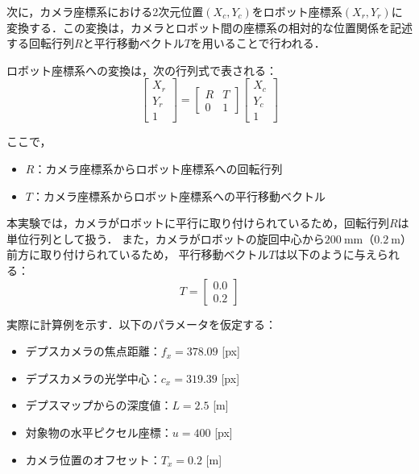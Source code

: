 次に，カメラ座標系における2次元位置$(X_c, Y_c)$をロボット座標系$(X_r, Y_r)$に変換する．この変換は，カメラとロボット間の座標系の相対的な位置関係を記述する回転行列$R$と平行移動ベクトル$T$を用いることで行われる．

ロボット座標系への変換は，次の行列式で表される：
\begin{equation}
    \begin{bmatrix}
        X_r \\ Y_r \\ 1
    \end{bmatrix}
    =
    \begin{bmatrix}
        R & T \\ 
        0 & 1
    \end{bmatrix}
    \begin{bmatrix}
        X_c \\ Y_c \\ 1
    \end{bmatrix}
    \label{eq:transform}
\end{equation}

ここで，
\begin{itemize}
    \item $R$：カメラ座標系からロボット座標系への回転行列
    \item $T$：カメラ座標系からロボット座標系への平行移動ベクトル
\end{itemize}

本実験では，カメラがロボットに平行に取り付けられているため，回転行列$R$は単位行列として扱う．
また，カメラがロボットの旋回中心から$200\ \mathrm{mm}$（$0.2\ \mathrm{m}$）前方に取り付けられているため，
平行移動ベクトル$T$は以下のように与えられる：
\begin{equation}
    T = \begin{bmatrix} 0.0 \\ 0.2 \end{bmatrix}
\end{equation}

実際に計算例を示す．以下のパラメータを仮定する：
\begin{itemize}
    \item デプスカメラの焦点距離：$f_x = 378.09$ [px]
    \item デプスカメラの光学中心：$c_x = 319.39$ [px]
    \item デプスマップからの深度値：$L = 2.5$ [m]
    \item 対象物の水平ピクセル座標：$u = 400$ [px]
    \item カメラ位置のオフセット：$T_x = 0.2$ [m]
\end{itemize}

